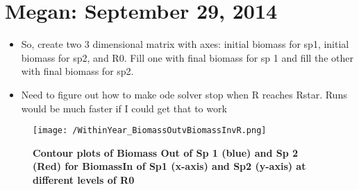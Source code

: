 \documentclass[11pt,a4paper,oneside]{article}
\begin{document}
\section{Megan: September 29, 2014}
\begin{itemize}
\item So, create two 3 dimensional matrix with axes: initial biomass for sp1, initial biomass for sp2, and R0.  Fill one with final biomass for sp 1 and fill the other with final biomass for sp2.
\item Need to figure out how to make ode solver stop when R reaches Rstar.  Runs would be much faster if I could get that to work
\end{itemize}
\begin{figure}[h!]
\centering
\noindent \texttt{[image: /WithinYear\_BiomassOutvBiomassInvR.png]}
\caption{{\bf Contour plots of Biomass Out of Sp 1 (blue) and Sp 2 (Red) for BiomassIn of Sp1 (x-axis) and Sp2 (y-axis) at different levels of R0}}
\end{figure}
\end{document}
